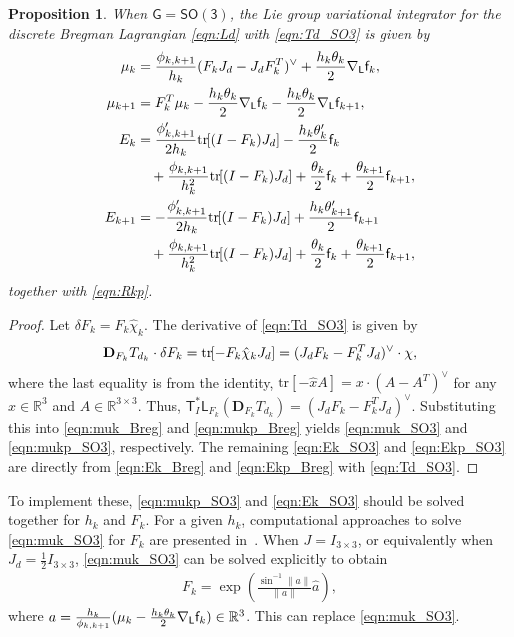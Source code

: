 \documentclass[letterpaper, 10pt, conference]{ieeeconf}
\newcommand{\bracket}[1]{\ensuremath{\left[ #1 \right]}}
\newcommand{\tr}[1]{\mbox{tr}\ensuremath{\negthickspace\bracket{#1}}}
\newcommand{\G}{\ensuremath{\mathsf{G}}}
\newcommand{\SO}{\ensuremath{\mathsf{SO(3)}}}
\newcommand{\T}{\ensuremath{\mathsf{T}}}
\renewcommand{\L}{\ensuremath{\mathsf{L}}}
\renewcommand{\Re}{\ensuremath{\mathbb{R}}}
\newcommand{\D}{\ensuremath{\mathbf{D}}}
\newtheorem{prop}{Proposition}
\begin{document}
\begin{prop}\label{prop:DEL_Breg_SO3}
    When $\G=\SO$, the Lie group variational integrator for the discrete Bregman Lagrangian \eqref{eqn:Ld} with \eqref{eqn:Td_SO3} is given by
\begin{align}
    \mu_k & =\frac{\phi_{k,k+1}}{h_k } (F_k J_d - J_dF_k^T)^\vee + \frac{h_k\theta_k }{2} \nabla_\L \obj_k, \label{eqn:muk_SO3} \\
    \mu_{k+1}  & = F_k^T \mu_k -\frac{h_k\theta_k}{2}\nabla_\L \obj_k - \frac{h_k\theta_k}{2} \nabla_\L \obj_{k+1}, \label{eqn:mukp_SO3}\\
    E_{k} & = \frac{\phi'_{k,k+1}}{ 2 h_k} \tr{(I-F_k)J_d} -\frac{h_k\theta'_{k}}{2} \obj_{k} \nonumber\\\
          & \quad + \frac{\phi_{k,k+1}}{h_k^2} \tr{(I-F_k)J_d} + \frac{\theta_k}{2}\obj_k + \frac{\theta_{k+1}}{2}\obj_{k+1}, \label{eqn:Ek_SO3}\\
    E_{k+1} & = -\frac{\phi'_{k,k+1}}{ 2 h_k} \tr{(I-F_k)J_d} +\frac{h_k\theta'_{k+1}}{2} \obj_{k+1}\nonumber \\\
            & \quad + \frac{\phi_{k,k+1}}{h_k^2} \tr{(I-F_k)J_d} +\frac{\theta_k}{2}\obj_k + \frac{\theta_{k+1}}{2}\obj_{k+1}, \label{eqn:Ekp_SO3}
\end{align}
together with \eqref{eqn:Rkp}.
\end{prop}
\begin{proof}
    Let $\delta F_k = F_k \hat\chi_k$.
    The derivative of \eqref{eqn:Td_SO3} is given by
    \begin{align*}
        \D_{F_k} T_{d_k} \cdot \delta F_k = \tr{-F_k\hat\chi_k J_d} = (J_dF_k - F_k^T J_d)^\vee \cdot \chi,
    \end{align*}
    where the last equality is from the identity, $\mathrm{tr}[-\hat x A]= x\cdot (A-A^T)^\vee$ for any $x\in\Re^3$ and $A\in\Re^{3\times 3}$.
    Thus, $\T^*_I \L_{F_k} (\D_{F_k} T_{d_k}) = (J_dF_k - F_k^T J_d)^\vee $. 
    Substituting this into \eqref{eqn:muk_Breg} and \eqref{eqn:mukp_Breg} yields \eqref{eqn:muk_SO3} and \eqref{eqn:mukp_SO3}, respectively. 
    The remaining \eqref{eqn:Ek_SO3} and \eqref{eqn:Ekp_SO3} are directly from \eqref{eqn:Ek_Breg} and \eqref{eqn:Ekp_Breg} with \eqref{eqn:Td_SO3}.
\end{proof}
To implement these, \eqref{eqn:mukp_SO3} and \eqref{eqn:Ek_SO3} should be solved together for $h_k$ and $F_k$.
For a given $h_k$, computational approaches to solve \eqref{eqn:muk_SO3} for $F_k$ are presented in~\cite[Sec 3.3.8]{Lee08}.
When $J=I_{3\times 3}$, or equivalently when $J_d = \frac{1}{2}I_{3\times 3}$, \eqref{eqn:muk_SO3} can be solved explicitly to obtain
\begin{align}
    F_k = \exp \left(\frac{\sin^{-1}\|a\|}{\|a\|}\hat a\right),\label{eqn:Fk_SO3}
\end{align}
where $a = \frac{h_k}{\phi_{k,k+1}} (\mu_k - \frac{h_k\theta_k}{2}\nabla_\L \obj_k)\in\Re^3$.
This can replace \eqref{eqn:muk_SO3}.
\end{document}
